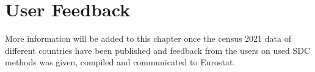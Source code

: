 \chapter{User Feedback}

More information will be added to this chapter once the census 2021 data of different countries have been published and feedback from the users on used SDC methods was given, compiled and communicated to Eurostat.


